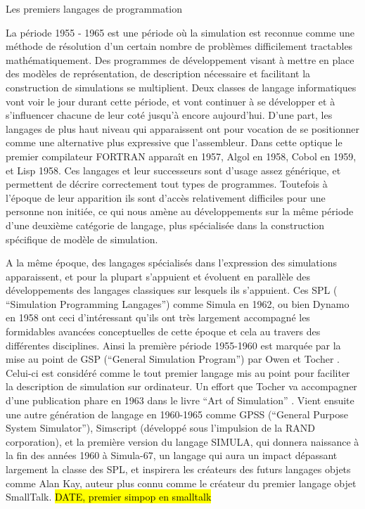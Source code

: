 \begin{framewithtitle}{ Les premiers langages de programmation }

La période 1955 - 1965 est une période où la simulation est reconnue comme une méthode de résolution d'un certain nombre de problèmes difficilement tractables mathématiquement.\autocite{Nance1993, Ackoff1961} Des programmes de développement visant à mettre en place des modèles de représentation, de description nécessaire et facilitant la construction de simulations se multiplient. Deux classes de langage informatiques vont voir le jour durant cette période, et vont continuer à se développer et à s'influencer chacune de leur coté jusqu'à encore aujourd'hui. D'une part, les langages de plus haut niveau qui apparaissent ont pour vocation de se positionner comme une alternative plus expressive que l'assembleur. Dans cette optique le premier compilateur FORTRAN apparaît en 1957,  Algol en 1958, Cobol en 1959, et Lisp 1958. Ces langages et leur successeurs sont d'usage assez générique, et permettent de décrire correctement tout types de programmes. Toutefois à l'époque de leur apparition ils sont d'accès relativement difficiles pour une personne non initiée, ce qui nous amène au développements sur la même période d'une deuxième catégorie de langage, plus spécialisée dans la construction spécifique de modèle de simulation. \autocite[239]{Naylor1966}

A la même époque, des langages spécialisés dans l'expression des simulations apparaissent, et pour la plupart s'appuient et évoluent en parallèle des développements des langages classiques sur lesquels ils s'appuient. Ces SPL ( \foreignquote{english}{Simulation Programming Langages}) comme Simula en 1962, ou bien Dynamo en 1958 ont ceci d'intéressant qu'ils ont très largement accompagné les formidables avancées conceptuelles de cette époque et cela au travers des différentes disciplines. Ainsi la première période 1955-1960 est marquée par la mise au point de GSP (\foreignquote{english}{General Simulation Program}) par Owen et Tocher \autocite{Tocher1960}. Celui-ci est considéré comme le tout premier langage mis au point pour faciliter la description de simulation sur ordinateur. Un effort que Tocher va accompagner d'une publication phare en 1963 dans le livre \foreignquote{english}{Art of Simulation} \autocite{Tocher1963} . Vient ensuite une autre génération de langage en 1960-1965 comme GPSS (\foreignquote{english}{General Purpose System Simulator}), Simscript (développé sous l'impulsion de la RAND corporation), et la première version du langage SIMULA, qui donnera naissance à la fin des années 1960 à Simula-67, un langage qui aura un impact dépassant largement la classe des SPL, et inspirera les créateurs des futurs langages objets comme Alan Kay, auteur plus connu comme le créateur du premier langage objet SmallTalk. \hl{DATE, premier simpop en smalltalk}

\end{framewithtitle}

